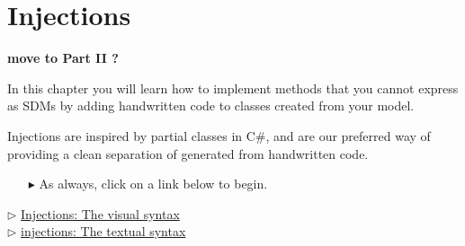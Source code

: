 \newpage
\section{Injections}
\genHeader
\hypertarget{sec:invertCard}{}

{\bf move to Part II ?}

In this chapter you will learn how to implement methods that you cannot express as SDMs by adding handwritten code to classes created from your model.

Injections are inspired by partial classes in C\#, and are our preferred way of providing a clean separation of generated from handwritten code.

\vspace{0.5cm}
\begin{itemize}
\item[$\blacktriangleright$] As always, click on a link below to begin.
\end{itemize}

\begin{center} {$\triangleright$ \hyperlink{injections vis}{Injections: The visual syntax}}%
\\ \vspace{0.5cm}
 {$\triangleright$ \hyperlink{injections tex}{injections: The textual syntax}}\end{center} 



